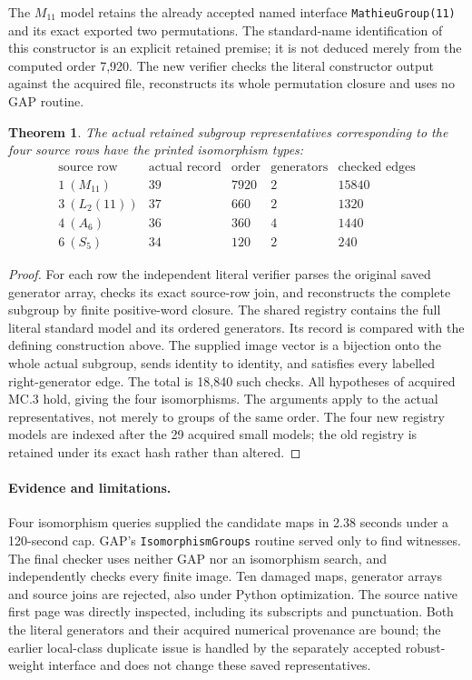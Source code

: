 \documentclass[11pt]{article}
\newtheorem{theorem}{Theorem}
\begin{document}
The $M_{11}$ model retains the already accepted named interface
\texttt{MathieuGroup(11)} and its exact exported two permutations. The
standard-name identification of this constructor is an explicit retained
premise; it is not deduced merely from the computed order 7,920. The new
verifier checks the literal constructor output against the acquired file,
reconstructs its whole permutation closure and uses no GAP routine.

\newpage
\begin{theorem}
The actual retained subgroup representatives corresponding to the four
source rows have the printed isomorphism types:
\[
\begin{array}{c|r|r|r|r}
\text{source row}&\text{actual record}&\text{order}&\text{generators}&
 \text{checked edges}\\\hline
1\ (M_{11})&39&7920&2&15840\\
3\ (L_2(11))&37&660&2&1320\\
4\ (A_6)&36&360&4&1440\\
6\ (S_5)&34&120&2&240
\end{array}
\]
\end{theorem}
\begin{proof}
For each row the independent literal verifier parses the original saved
generator array, checks its exact source-row join, and reconstructs the
complete subgroup by finite positive-word closure. The shared registry
contains the full literal standard model and its ordered generators. Its
record is compared with the defining construction above. The supplied
image vector is a bijection onto the whole actual subgroup, sends identity
to identity, and satisfies every labelled right-generator edge. The total
is 18,840 such checks. All hypotheses of acquired MC.3 hold, giving the
four isomorphisms. The arguments apply to the actual representatives, not
merely to groups of the same order. The four new registry models are
indexed after the 29 acquired small models; the old registry is retained
under its exact hash rather than altered.
\end{proof}

\paragraph{Evidence and limitations.}
Four isomorphism queries supplied the candidate maps in 2.38 seconds under
a 120-second cap. GAP's \texttt{IsomorphismGroups} routine served only to
find witnesses. The final checker uses neither GAP nor an isomorphism
search, and independently checks every finite image. Ten damaged maps,
generator arrays and source joins are rejected, also under Python
optimization. The source native first page was directly inspected, including
its subscripts and punctuation. Both the literal generators and their
acquired numerical provenance are bound; the earlier local-class duplicate
issue is handled by the separately accepted robust-weight interface and
does not change these saved representatives.
\end{document}

